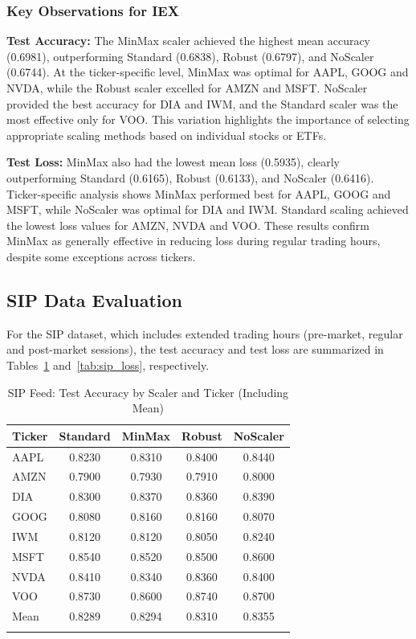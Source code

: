 \documentclass[letterpaper]{article}
\begin{document}
\subsubsection*{Key Observations for IEX}

\textbf{Test Accuracy:} The MinMax scaler achieved the highest mean accuracy (0.6981), outperforming Standard (0.6838), Robust (0.6797), and NoScaler (0.6744). At the ticker-specific level, MinMax was optimal for AAPL, GOOG and NVDA, while the Robust scaler excelled for AMZN and MSFT. NoScaler provided the best accuracy for DIA and IWM, and the Standard scaler was the most effective only for VOO. This variation highlights the importance of selecting appropriate scaling methods based on individual stocks or ETFs.

\textbf{Test Loss:} MinMax also had the lowest mean loss (0.5935), clearly outperforming Standard (0.6165), Robust (0.6133), and NoScaler (0.6416). Ticker-specific analysis shows MinMax performed best for AAPL, GOOG and MSFT, while NoScaler was optimal for DIA and IWM. Standard scaling achieved the lowest loss values for AMZN, NVDA and VOO. These results confirm MinMax as generally effective in reducing loss during regular trading hours, despite some exceptions across tickers.

\subsection{SIP Data Evaluation}

For the SIP dataset, which includes extended trading hours (pre-market, regular and post-market sessions), the test accuracy and test loss are summarized in Tables~\ref{tab:sip_accuracy} and~\ref{tab:sip_loss}, respectively.

\begin{table}[H]
\centering
\caption{SIP Feed: Test Accuracy by Scaler and Ticker (Including Mean)}
\begin{tabular}{lcccc}
\toprule
\textbf{Ticker} & \textbf{Standard} & \textbf{MinMax} & \textbf{Robust} & \textbf{NoScaler} \\
\midrule 
AAPL & 0.8230 & 0.8310 & 0.8400 & \cellcolor{green!30} 0.8440 \\ 
AMZN & 0.7900 & 0.7930 & 0.7910 & \cellcolor{green!30} 0.8000 \\ 
DIA  & 0.8300 & 0.8370 & 0.8360 & \cellcolor{green!30} 0.8390 \\ 
GOOG & 0.8080 & \cellcolor{green!30}0.8160 & \cellcolor{green!30}0.8160 & 0.8070 \\ 
IWM  & 0.8120 & 0.8120 & 0.8050 & \cellcolor{green!30}0.8240 \\ 
MSFT & 0.8540 & 0.8520 & 0.8500 & \cellcolor{green!30} 0.8600 \\ 
NVDA & \cellcolor{green!30}0.8410 & 0.8340 & 0.8360 & 0.8400 \\ 
VOO  & 0.8730 & 0.8600 & \cellcolor{green!30}0.8740 & 0.8700 \\ 
\midrule
Mean & 0.8289 & 0.8294 & 0.8310 & \cellcolor{green!30} 0.8355 \\ 
\bottomrule
\label{tab:sip_accuracy}
\end{tabular}
\end{table}
\end{document}
